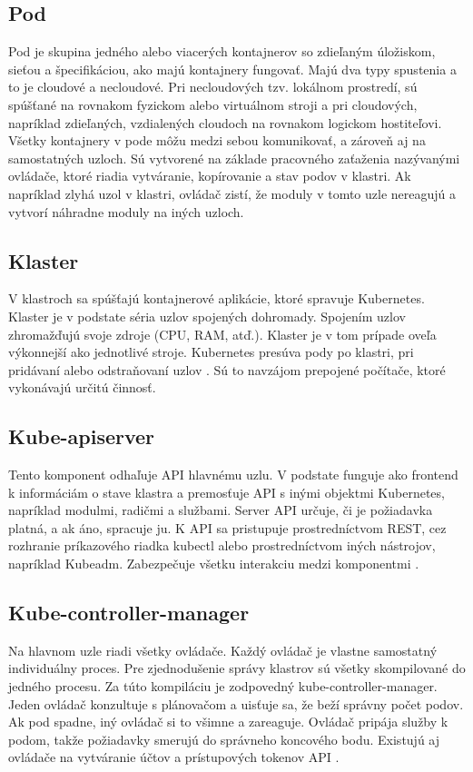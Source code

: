 \subsection*{Pod}
Pod je skupina jedného alebo viacerých kontajnerov so zdieľaným úložiskom, sieťou a špecifikáciou, ako majú kontajnery fungovať. Majú dva typy spustenia a to je cloudové a necloudové. Pri necloudových tzv. lokálnom prostredí, sú spúšťané na rovnakom fyzickom alebo virtuálnom stroji a pri cloudových, napríklad zdieľaných, vzdialených cloudoch na rovnakom logickom hostiteľovi. Všetky kontajnery v pode môžu medzi sebou komunikovať, a zároveň aj na samostatných uzloch. Sú vytvorené na základe pracovného zaťaženia nazývanými ovládače, ktoré riadia vytváranie, kopírovanie a stav podov v klastri. Ak napríklad zlyhá uzol v klastri, ovládač zistí, že moduly v tomto uzle nereagujú a vytvorí náhradne moduly na iných uzloch.

\subsection*{Klaster}
V klastroch sa spúšťajú kontajnerové aplikácie, ktoré spravuje Kubernetes. Klaster je v podstate séria uzlov spojených dohromady. Spojením uzlov zhromažďujú svoje zdroje (CPU, RAM, atď.). Klaster je v tom prípade oveľa výkonnejší ako jednotlivé stroje. Kubernetes presúva pody po klastri, pri pridávaní alebo odstraňovaní uzlov \cite{kubernetes2}. Sú to navzájom prepojené počítače, ktoré vykonávajú určitú činnosť.

\subsection*{Kube-apiserver}
Tento komponent odhaľuje API hlavnému uzlu. V podstate funguje ako frontend k informáciám o stave klastra a premosťuje API s inými objektmi Kubernetes, napríklad modulmi, radičmi a službami. Server API určuje, či je požiadavka platná, a ak áno, spracuje ju. K API sa pristupuje prostredníctvom REST, cez rozhranie príkazového riadka kubectl alebo prostredníctvom iných nástrojov, napríklad Kubeadm. Zabezpečuje všetku interakciu medzi komponentmi \cite{kubeapiserver}.

\subsection*{Kube-controller-manager}
Na hlavnom uzle riadi všetky ovládače. Každý ovládač je vlastne samostatný individuálny proces. Pre zjednodušenie správy klastrov sú všetky skompilované do jedného procesu. Za túto kompiláciu je zodpovedný kube-controller-manager. Jeden ovládač konzultuje s plánovačom a uisťuje sa, že beží správny počet podov. Ak pod spadne, iný ovládač si to všimne a zareaguje. Ovládač pripája služby k podom, takže požiadavky smerujú do správneho koncového bodu. Existujú aj ovládače na vytváranie účtov a prístupových tokenov API \cite{kubecontroler}.

